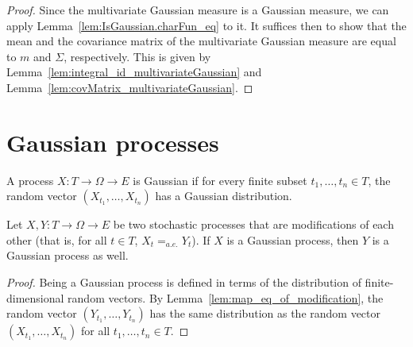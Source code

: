 \begin{proof}\mathlibok
Since the multivariate Gaussian measure is a Gaussian measure, we can apply Lemma~\ref{lem:IsGaussian.charFun_eq} to it.
It suffices then to show that the mean and the covariance matrix of the multivariate Gaussian measure are equal to $m$ and $\Sigma$, respectively.
This is given by Lemma~\ref{lem:integral_id_multivariateGaussian} and Lemma~\ref{lem:covMatrix_multivariateGaussian}.
\end{proof}


\section{Gaussian processes}
\label{sec:gaussian_processes}

\begin{definition}\label{def:IsGaussianProcess}
  \mathlibok
A process $X : T \to \Omega \to E$ is Gaussian if for every finite subset $t_1, \ldots, t_n \in T$, the random vector $(X_{t_1}, \ldots, X_{t_n})$ has a Gaussian distribution.
\end{definition}


\begin{lemma}\label{lem:isGaussianProcess_of_modification}
  \mathlibok
Let $X, Y : T \to \Omega \to E$ be two stochastic processes that are modifications of each other (that is, for all $t \in T$, $X_t =_{a.e.} Y_t$).
If $X$ is a Gaussian process, then $Y$ is a Gaussian process as well.
\end{lemma}

\begin{proof}\leanok
Being a Gaussian process is defined in terms of the distribution of finite-dimensional random vectors.
By Lemma~\ref{lem:map_eq_of_modification}, the random vector $(Y_{t_1}, \ldots, Y_{t_n})$ has the same distribution as the random vector $(X_{t_1}, \ldots, X_{t_n})$ for all $t_1, \ldots, t_n \in T$.
\end{proof}

